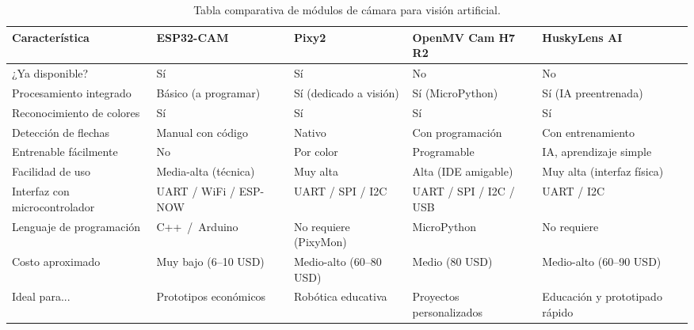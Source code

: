 \documentclass{prgrado}
\begin{document}
\begin{table}[ht]
    \centering
    \small
    \begin{tabularx}{\textwidth}{lYYYY}
        \toprule
        \textbf{Característica} & \textbf{ESP32-CAM} & \textbf{Pixy2} & \textbf{OpenMV Cam H7 R2} & \textbf{HuskyLens AI} \\
        \midrule
        ¿Ya disponible? &
        Sí &
        Sí &
        No &
        No \\
        
        Procesamiento integrado &
        Básico (a programar) &
        Sí (dedicado a visión) &
        Sí (MicroPython) &
        Sí (IA preentrenada) \\
        
        Reconocimiento de colores &
        Sí &
        Sí &
        Sí &
        Sí \\
        
        Detección de flechas &
        Manual con código &
        Nativo &
        Con programación &
        Con entrenamiento \\
        
        Entrenable fácilmente &
        No &
        Por color &
        Programable &
        IA, aprendizaje simple \\
        
        Facilidad de uso &
        Media-alta (técnica) &
        Muy alta &
        Alta (IDE amigable) &
        Muy alta (interfaz física) \\
        
        Interfaz con microcontrolador &
        UART / WiFi / ESP-NOW &
        UART / SPI / I2C &
        UART / SPI / I2C / USB &
        UART / I2C \\
        
        Lenguaje de programación &
        \mbox{C++ / Arduino} &
        No requiere (PixyMon) &
        MicroPython &
        No requiere \\
        
        Costo aproximado &
        Muy bajo (6--10 USD) &
        Medio-alto (60--80 USD) &
        Medio (80 USD) &
        Medio-alto (60--90 USD) \\
        
        Ideal para... &
        Prototipos económicos &
        Robótica educativa &
        Proyectos personalizados &
        Educación y prototipado rápido \\
        \bottomrule
    \end{tabularx}
    \caption{Tabla comparativa de módulos de cámara para visión artificial.}
    \label{tab:comparativa-camaras}
\end{table}
\end{document}

